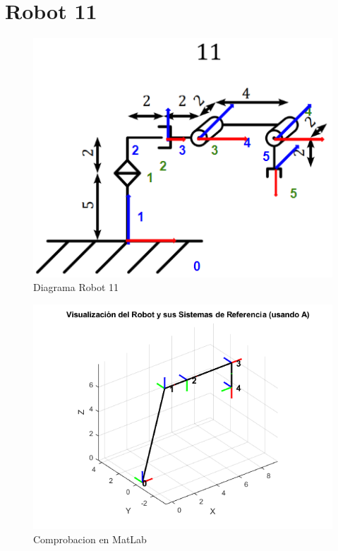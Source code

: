 \section{Robot 11}
\begin{figure}[h]
	\centering
	\includegraphics[width=0.5\linewidth]{../Prueba_DH/img/Diagrama11}
	\caption{Diagrama Robot 11}
	\label{fig:diagrama11}
\end{figure}
\begin{figure}
	\centering
	\includegraphics[width=0.7\linewidth]{../Prueba_DH/img/MatLab11}
	\caption{Comprobacion en MatLab}
	\label{fig:matlab11}
\end{figure}